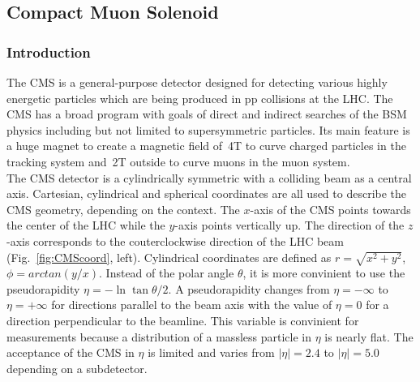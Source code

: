 \subsection{Compact Muon Solenoid}
\label{sec:Exp_CMS}
\subsubsection{Introduction}

The CMS is a general-purpose detector designed for detecting various highly energetic particles which are being produced in pp collisions at the LHC. The CMS has a broad program with goals of direct and indirect searches of the BSM physics including but not limited to supersymmetric particles. Its main feature is a huge magnet to create a magnetic field of~4T to curve charged particles in the tracking system and~2T outside to curve muons in the muon system.\\

The CMS detector is a cylindrically symmetric with a colliding beam as a central axis. Cartesian, cylindrical and spherical coordinates are all used to describe the CMS geometry, depending on the context. The $x$-axis of the CMS points towards the center of the LHC while the $y$-axis points vertically up. The direction of the $z$-axis corresponds to the couterclockwise direction of the LHC beam (Fig.~\ref{fig:CMScoord}, left). Cylindrical coordinates are defined as $r=\sqrt{x^2+y^2}$, $\phi=arctan(y/x)$. Instead of the polar angle $\theta$, it is more convinient to use the pseudorapidity $\eta=-\ln{\tan{\theta/2}}$. A pseudorapidity changes from $\eta=-\infty$ to $\eta=+\infty$ for directions parallel to the beam axis with the value of $\eta=0$ for a direction perpendicular to the beamline. This variable is convinient for measurements because a distribution of a massless particle in $\eta$ is nearly flat. The acceptance of the CMS in $\eta$ is limited and varies from $|\eta|=2.4$ to $|\eta|=5.0$ depending on a subdetector.  \\ 

